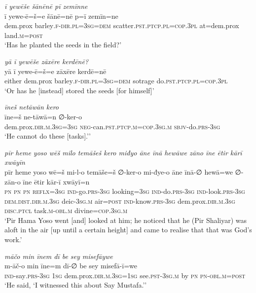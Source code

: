 \ea \label{ŽP.44}
\textit{ī yewēše šānēnē pī zemīnne} \\ 
\gll ī yewe-ē=š=e šānē=nē p=ī zemīn=ne \\ 
 dem.prox barley\textsc{.f}\textsc{-dir}\textsc{.pl}\textsc{=3sg}\textsc{=dem} scatter\textsc{.pst}\textsc{.ptcp}\textsc{.pl}\textsc{=cop}\textsc{.3pl} at=dem.prox land\textsc{.m}\textsc{=\textsc{post}} \\ 
\glt `Has he planted the seeds in the field?'
\z 
 
\ea \label{ŽP.45}
\textit{yā ī yewēše zāxēre kerdēnē?} \\ 
\gll yā ī yewe-ē=š=e zāxēre kerdē=nē \\ 
 either dem.prox barley\textsc{.f}\textsc{-dir}\textsc{.pl}\textsc{=3sg}\textsc{=dem} sotrage do\textsc{.pst}\textsc{.ptcp}\textsc{.pl}\textsc{=cop}\textsc{.3pl} \\ 
\glt `Or has he [instead] stored the seeds [for himself]'
\z 
 
\ea \label{ŽP.49}
\textit{īneš netāwān kero} \\ 
\gll īne=š ne-tāwā=n ∅-ker-o \\ 
 dem.prox\textsc{.dir}\textsc{.m}\textsc{.3sg}\textsc{=3sg} \textsc{neg-}can\textsc{.pst}\textsc{.ptcp}\textsc{.m}\textsc{=cop}\textsc{.3sg}\textsc{.m} \textsc{sbjv-}do\textsc{.prs}\textsc{-3sg} \\ 
\glt `He cannot do these [tasks].’'
\z 
 
\ea \label{ŽP.71}
\textit{pīr heme yoso wēš milo temāšeš kero miđyo āne īnā hewāwe zāno īne ētir kārī xwāyīn} \\ 
\gll pīr heme yoso wē=š mi-l-o temāše=š ∅-ker-o mi-đye-o āne īnā-∅ hewā=we ∅-zān-o īne ētir kār-ī xwāyī=n \\ 
 \textsc{pn} \textsc{pn} \textsc{pn} \textsc{reflx}\textsc{=3sg} \textsc{ind-}go\textsc{.prs}\textsc{-3sg} looking\textsc{=3sg} \textsc{ind-}do\textsc{.prs}\textsc{-3sg} \textsc{ind-}look\textsc{.prs}\textsc{-3sg} \textsc{dem.dist}\textsc{.dir}\textsc{.m}\textsc{.3sg} deic\textsc{-3sg}\textsc{.m} air\textsc{=\textsc{post}} \textsc{ind-}know\textsc{.prs}\textsc{-3sg} dem.prox\textsc{.dir}\textsc{.m}\textsc{.3sg} \textsc{disc.ptcl} task\textsc{.m}\textsc{-obl}\textsc{.m} divine\textsc{=cop}\textsc{.3sg}\textsc{.m} \\ 
\glt `Pir Hama Yoso went [and] looked at him; he noticed that he (Pir Shaliyar) was aloft in the air [up until a certain height] and came to realise that that was God’s work.'
\z 
 
\ea \label{ŽP.74}
\textit{māčo min īnem dī be sey misefāywe} \\ 
\gll m-āč-o min īne=m dī-∅ be sey misefā-ī=we \\ 
 \textsc{ind-}say\textsc{.prs}\textsc{-3sg} \textsc{1sg} dem.prox\textsc{.dir}\textsc{.m}\textsc{.3sg}\textsc{=\textsc{1sg}} see\textsc{.pst}\textsc{-3sg}\textsc{.m} by \textsc{pn} \textsc{pn}\textsc{-obl}\textsc{.m}\textsc{=\textsc{post}} \\ 
\glt `He said, ‘I witnessed this about Say Mustafa.’'
\z 
 
